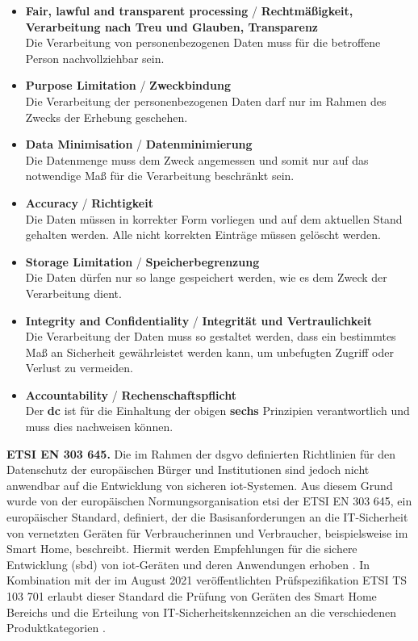 \begin{itemize}
    \item \textbf{Fair, lawful and transparent processing} / \textbf{Rechtmäßigkeit, Verarbeitung nach Treu und Glauben, Transparenz} \\ Die Verarbeitung von personenbezogenen Daten muss für die betroffene Person nachvollziehbar sein.
    \item \textbf{Purpose Limitation} / \textbf{Zweckbindung} \\ Die Verarbeitung der personenbezogenen Daten darf nur im Rahmen des Zwecks der Erhebung geschehen.
    \item \textbf{Data Minimisation} / \textbf{Datenminimierung} \\ Die Datenmenge muss dem Zweck angemessen und somit nur auf das notwendige Maß für die Verarbeitung beschränkt sein.
    \item \textbf{Accuracy} / \textbf{Richtigkeit} \\ Die Daten müssen in korrekter Form vorliegen und auf dem aktuellen Stand gehalten werden. Alle nicht korrekten Einträge müssen gelöscht werden.
    \item \textbf{Storage Limitation} / \textbf{Speicherbegrenzung} \\ Die Daten dürfen nur so lange gespeichert werden, wie es dem Zweck der Verarbeitung dient.
    \item \textbf{Integrity and Confidentiality} / \textbf{Integrität und Vertraulichkeit} \\ Die Verarbeitung der Daten muss so gestaltet werden, dass ein bestimmtes Maß an Sicherheit gewährleistet werden kann, um unbefugten Zugriff oder Verlust zu vermeiden.
    \item \textbf{Accountability} / \textbf{Rechenschaftspflicht} \\ Der \textbf{\ac{dc}} ist für die Einhaltung der obigen \textbf{sechs} Prinzipien verantwortlich und muss dies nachweisen können.
\end{itemize}

\noindent \textbf{ETSI EN 303 645.}
Die im Rahmen der \ac{dsgvo} definierten Richtlinien für den Datenschutz der europäischen Bürger und Institutionen sind jedoch nicht anwendbar auf die Entwicklung von sicheren \ac{iot}-Systemen. Aus diesem Grund wurde von der europäischen Normungsorganisation \acl{etsi} der ETSI EN 303 645, ein europäischer Standard, definiert, der die Basisanforderungen an die IT-Sicherheit von vernetzten Geräten für Verbraucherinnen und Verbraucher, beispielsweise im Smart Home, beschreibt. Hiermit werden Empfehlungen für die sichere Entwicklung (\acl{sbd}) von \ac{iot}-Geräten und deren Anwendungen erhoben \cite{BSI2020}. In Kombination mit der im August 2021 veröffentlichten Prüfspezifikation ETSI TS 103 701 erlaubt dieser Standard die Prüfung von Geräten des Smart Home Bereichs und die Erteilung von IT-Sicherheitskennzeichen an die verschiedenen Produktkategorien \cite{BSI2022}.

